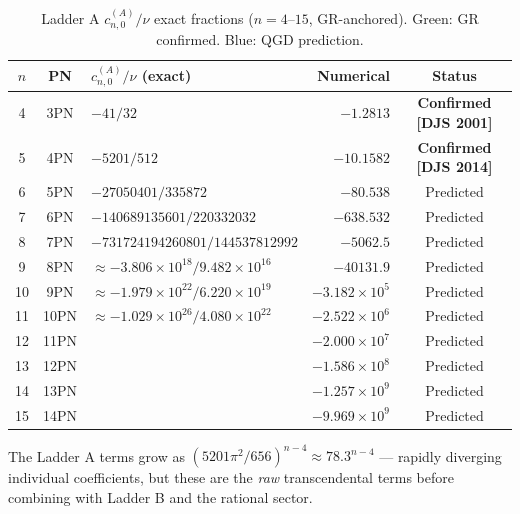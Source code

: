 \documentclass[11pt,a4paper]{article}
\theoremstyle{plain}
\theoremstyle{definition}
\theoremstyle{remark}
\newcommand{\cA}{c^{(A)}}
\begin{document}
\begin{table}[h]
\centering\small
\renewcommand{\arraystretch}{1.25}
\caption{Ladder A $\cA_{n,0}/\nu$ exact fractions ($n=4$--$15$, GR-anchored).
\textcolor{confirmed}{Green}: GR confirmed.
\textcolor{predicted}{Blue}: QGD prediction.}
\label{tab:LA}
\begin{tabular}{@{}cclrc@{}}
\toprule
$n$ & PN & $\cA_{n,0}/\nu$ (exact) & Numerical & Status \\
\midrule
\rowcolor{lightgray}
4 & 3PN & $-41/32$ & $-1.2813$ & \textcolor{confirmed}{\textbf{Confirmed [DJS 2001]}} \\
5 & 4PN & $-5201/512$ & $-10.1582$ & \textcolor{confirmed}{\textbf{Confirmed [DJS 2014]}} \\
\rowcolor{lightgray}
6 & 5PN & $-27050401/335872$ & $-80.538$ & \textcolor{predicted}{Predicted} \\
7 & 6PN & $-140689135601/220332032$ & $-638.532$ & \textcolor{predicted}{Predicted} \\
\rowcolor{lightgray}
8 & 7PN & $-731724194260801/144537812992$ & $-5062.5$ & \textcolor{predicted}{Predicted} \\
9 & 8PN & $\approx-3.806\times10^{18}/9.482\times10^{16}$ & $-40131.9$ & \textcolor{predicted}{Predicted} \\
\rowcolor{lightgray}
10 & 9PN & $\approx-1.979\times10^{22}/6.220\times10^{19}$ & $-3.182\times10^5$ & \textcolor{predicted}{Predicted} \\
11 & 10PN & $\approx-1.029\times10^{26}/4.080\times10^{22}$ & $-2.522\times10^6$ & \textcolor{predicted}{Predicted} \\
\rowcolor{lightgray}
12 & 11PN & & $-2.000\times10^7$ & \textcolor{predicted}{Predicted} \\
13 & 12PN & & $-1.586\times10^8$ & \textcolor{predicted}{Predicted} \\
\rowcolor{lightgray}
14 & 13PN & & $-1.257\times10^9$ & \textcolor{predicted}{Predicted} \\
15 & 14PN & & $-9.969\times10^9$ & \textcolor{predicted}{Predicted} \\
\bottomrule
\end{tabular}
\end{table}

The Ladder A terms grow as $(5201\pi^2/656)^{n-4} \approx 78.3^{n-4}$
--- rapidly diverging individual coefficients, but these are the
\emph{raw} transcendental terms before combining with Ladder B and the rational sector.

\end{document}
